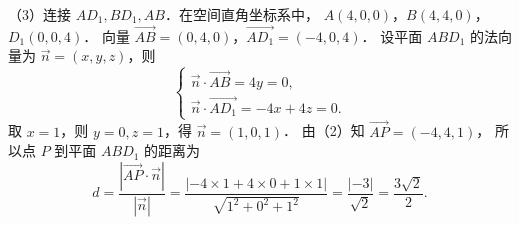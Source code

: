 \begin{answer}
（3）连接 $AD_1, BD_1, AB$．在空间直角坐标系中，
$A(4, 0, 0)$，$B(4, 4, 0)$，$D_1(0, 0, 4)$．
向量 $\vec{AB} = (0, 4, 0)$，$\vec{AD_1} = (-4, 0, 4)$．
设平面 $ABD_1$ 的法向量为 $\vec{n} = (x, y, z)$，则
\nopagebreak[4]
\[
\begin{cases}
\vec{n} \cdot \vec{AB} = 4y = 0, \\
\vec{n} \cdot \vec{AD_1} = -4x + 4z = 0.
\end{cases}
\]
取 $x = 1$，则 $y = 0, z = 1$，得 $\vec{n} = (1, 0, 1)$．
由（2）知 $\vec{AP} = (-4, 4, 1)$，
所以点 $P$ 到平面 $ABD_1$ 的距离为
\nopagebreak[4]
\[
d = \frac{|\vec{AP} \cdot \vec{n}|}{|\vec{n}|} = \frac{|-4 \times 1 + 4 \times 0 + 1 \times 1|}{\sqrt{1^2 + 0^2 + 1^2}} = \frac{|-3|}{\sqrt{2}} = \frac{3\sqrt{2}}{2}.
\]


\end{answer}
